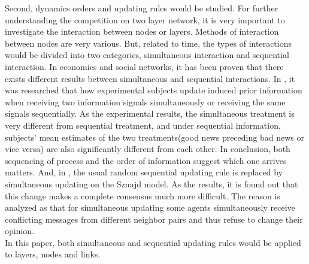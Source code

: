 Second, dynamics orders and updating rules would be studied. For further understanding the competition on two layer network, it is very important to investigate the interaction between nodes or layers. Methods of interaction between nodes are very various.\parencite{sirbu2017} But, related to time, the types of interactions would be divided into two categories, simultaneous interaction and sequential interaction. In economics and social networks, it has been proven that there exists different results between simultaneous and sequential interactions.\parencite{hoffman2011, dietrich2004} In \parencite{hoffman2011}, it was researched that how experimental subjects update induced prior information when receiving two information signals simultaneously or receiving the same signals sequentially. As the experimental results, the simultaneous treatment is very different from sequential treatment, and under sequential information,  subjects’ mean estimates of the two treatments(good news preceding bad news or vice versa) are also significantly different from each other. In conclusion, both sequencing of process and the order of information suggest which one arrives matters. And, in \parencite{dietrich2004}, the usual random sequential updating rule is replaced by simultaneous updating on the Sznajd model. As the results, it is found out that this change makes a complete consensus much more difficult. The reason is analyzed as that for simultaneous updating some agents simultaneously receive conflicting messages from different neighbor pairs and thus refuse to change their opinion.\\
In this paper, both simultaneous and sequential updating rules would be applied to layers, nodes and links.\\

